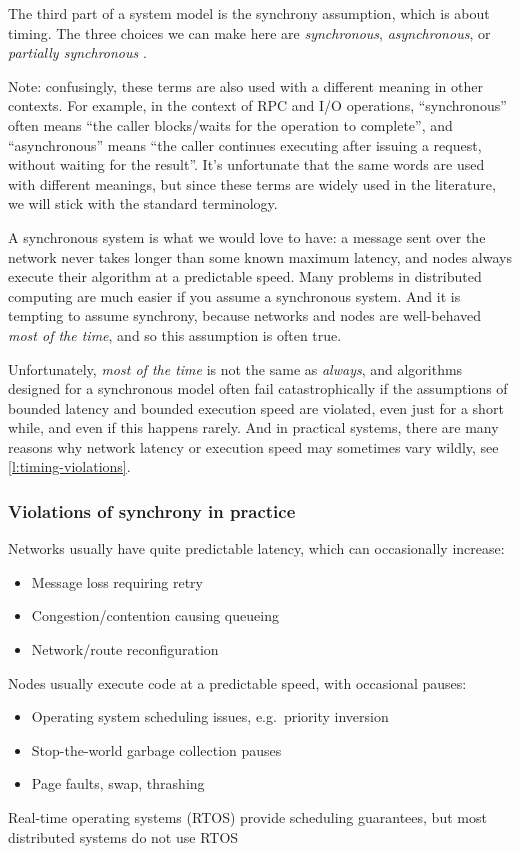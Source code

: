 The third part of a system model is the synchrony assumption, which is about timing.
The three choices we can make here are \emph{synchronous}, \emph{asynchronous}, or \emph{partially synchronous} \citep{Dwork:1988dr}.

\begin{mdframed}
Note: confusingly, these terms are also used with a different meaning in other contexts.
For example, in the context of RPC and I/O operations, ``synchronous'' often means ``the caller blocks/waits for the operation to complete'', and ``asynchronous'' means ``the caller continues executing after issuing a request, without waiting for the result''.
It's unfortunate that the same words are used with different meanings, but since these terms are widely used in the literature, we will stick with the standard terminology.
\end{mdframed}

A synchronous system is what we would love to have: a message sent over the network never takes longer than some known maximum latency, and nodes always execute their algorithm at a predictable speed.
Many problems in distributed computing are much easier if you assume a synchronous system.
And it is tempting to assume synchrony, because networks and nodes are well-behaved \emph{most of the time}, and so this assumption is often true.

Unfortunately, \emph{most of the time} is not the same as \emph{always}, and algorithms designed for a synchronous model often fail catastrophically if the assumptions of bounded latency and bounded execution speed are violated, even just for a short while, and even if this happens rarely.
And in practical systems, there are many reasons why network latency or execution speed may sometimes vary wildly, see \autoref{l:timing-violations}.

\begin{frame}
    \label{s:timing-violations}
    \frametitle{Violations of synchrony in practice}
    Networks usually have quite predictable latency, which can occasionally increase:
    \begin{itemize}
        \item Message loss requiring retry
        \item Congestion/contention causing queueing
        \item Network/route reconfiguration\\[1em]
    \end{itemize}\pause
    Nodes usually execute code at a predictable speed, with occasional pauses:
    \begin{itemize}
        \item Operating system scheduling issues, e.g.\ priority inversion
        \item Stop-the-world garbage collection pauses
        \item Page faults, swap, thrashing
    \end{itemize}
    Real-time operating systems (RTOS) provide scheduling guarantees, but most distributed systems do not use RTOS
\end{frame}
\label{l:timing-violations}

